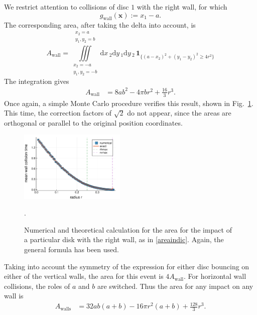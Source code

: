 \documentclass[superscriptaddress,pre,reprint,showpacs,twocolumn]{revtex4-1}
\newcommand{\rd}[1]{\mathrm{d}{#1} \,}
\newcommand{\indicatorsymbol}{\mathbf{1}}
\newcommand{\indicator}[1]{\indicatorsymbol_{ \{   #1 \} } }
\begin{document}
We restrict attention to collisions of disc $1$ with the right wall, for which
$$g_\text{wall}(\mathbf{x}) := x_1 - a.$$
The corresponding area, after taking the delta into account, is
\begin{equation}\label{areaindic}
  A_\mathrm{wall} =  \iiint \limits_ {\substack{x_2 = -a \\ y_1, y_2 = -b }}^
  {\substack{x_2=a\\ y_1,y_2=b}} 
   \rd x_2   \rd y_1   \rd y_2 \, \indicator{ (a-x_2)^2 + (y_1-y_2)^2 \ge 4 r^2 }
\end{equation}
The integration gives
\begin{align}\label{areax1p}
 A_\mathrm{wall} & = 8 a b^2-4  \pi b r^2 +\frac{16}{3}r^3 .
\end{align}
Once again, a simple Monte Carlo procedure verifies this result,
shown in Fig.~\ref{area1derecha}. 
This time, the correction factors of $\sqrt{2}$ do not appear, since
the areas are orthogonal or parallel to the original
position coordinates.


\begin{figure}
\centering
\includegraphics[width=0.45\textwidth]{./figures/AreaWall01.pdf}
\caption{Numerical and theoretical calculation for the area
for the impact of a particular disk with the right wall, as in \eqref{areaindic}.
Again, the general formula has been used.}
\label{area1derecha}.
\end{figure}

Taking into account the symmetry of the expression for either disc
 bouncing on either of the vertical walls, the
area for this event is  $4A_\text{wall}$. For horizontal wall 
collisions, the roles of $a$ and $b$ are switched.
Thus the area for any impact on any wall is
\begin{align}\label{areawalls}
 A_\text{walls} & = 32 a b (a+b)-16 \pi r^2 (a+b) +\frac{128}{3}r^3.
\end{align}
\end{document}
